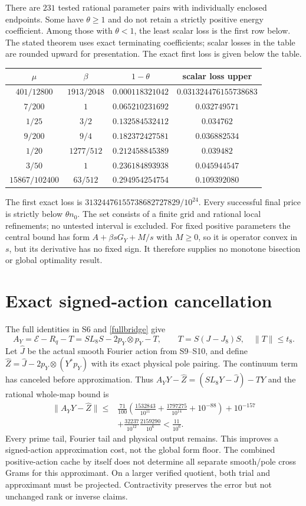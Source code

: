 \documentclass[11pt]{article}
\numberwithin{equation}{section}
\begin{document}
There are $231$ tested rational parameter pairs with individually
enclosed endpoints. Some have $\theta\ge1$ and do not retain a
strictly positive energy coefficient. Among those with $\theta<1$,
the least scalar loss is the first row below. The stated theorem uses
exact terminating coefficients; scalar losses in the table are rounded
upward for presentation. The exact first loss is given below the table.
\begin{center}
\begin{tabular}{c|c|c|c}
$\mu$ & $\beta$ & $1-\theta$ & scalar loss upper\\\hline
$401/12800$ & $1913/2048$ & $0.000118321042$ & $0.031324476155738683$\\
$7/200$ & $1$ & $0.065210231692$ & $0.032749571$\\
$1/25$ & $3/2$ & $0.132584532412$ & $0.034762$\\
$9/200$ & $9/4$ & $0.182372427581$ & $0.036882534$\\
$1/20$ & $1277/512$ & $0.212458845389$ & $0.039482$\\
$3/50$ & $1$ & $0.236184893938$ & $0.045944547$\\
$15867/102400$ & $63/512$ & $0.294954254754$ & $0.109392080$
\end{tabular}
\end{center}
The first exact loss is $31324476155738682727829/10^{24}$.
Every successful final price is strictly below $\theta n_0$.
The set consists of a finite grid and rational local refinements;
no untested interval is excluded. For fixed positive parameters the
central bound has form $A+\beta sG_Y+M/s$ with $M\ge0$, so it is
operator convex in $s$, but its derivative has no fixed sign. It
therefore supplies no monotone bisection or global optimality result.

\section{Exact signed-action cancellation}\label{signedsupp}
The full identities in S6 and \eqref{fullbridge} give
\[
 A_Y=\mathcal E-R_q-T=SL_8S-2p_Y\otimes p_Y-T,
 \qquad T=S(J-J_8)S,\quad\|T\|\le t_8.
\]
Let $\widehat J$ be the actual smooth Fourier action from S9--S10,
and define
$\widehat Z=\widehat J-2p_Y\otimes(Y^*p_Y)$ with its exact physical
pole pairing. The continuum term has canceled before approximation.
Thus $A_YY-\widehat Z=(SL_8Y-\widehat J)-TY$ and the rational
whole-map bound is
\begin{align*}
 \|A_YY-\widehat Z\|\le{}&
 \frac{71}{100}\left(\frac{1532843}{10^{11}}+
       \frac{1797275}{10^{14}}+10^{-88}\right)+10^{-157}\\
 &+\frac{32237}{10^{12}}\frac{2159290}{10^6}<\frac{11}{10^6}.
\end{align*}
Every prime tail, Fourier tail and physical output remains.
This improves a signed-action approximation cost, not the global
form floor. The combined positive-action cache by itself does not
determine all separate smooth/pole cross Grams for this approximant.
On a larger verified quotient, both trial and approximant must be
projected. Contractivity preserves the error but not unchanged rank
or inverse claims.
\end{document}
